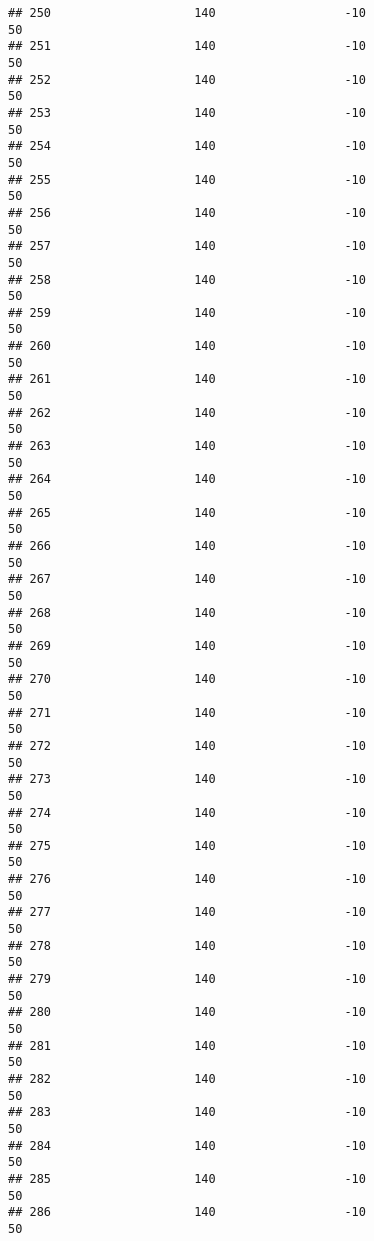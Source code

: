 \documentclass[]{article}
\begin{document}
\begin{verbatim}
## 250                    140                  -10                   50
## 251                    140                  -10                   50
## 252                    140                  -10                   50
## 253                    140                  -10                   50
## 254                    140                  -10                   50
## 255                    140                  -10                   50
## 256                    140                  -10                   50
## 257                    140                  -10                   50
## 258                    140                  -10                   50
## 259                    140                  -10                   50
## 260                    140                  -10                   50
## 261                    140                  -10                   50
## 262                    140                  -10                   50
## 263                    140                  -10                   50
## 264                    140                  -10                   50
## 265                    140                  -10                   50
## 266                    140                  -10                   50
## 267                    140                  -10                   50
## 268                    140                  -10                   50
## 269                    140                  -10                   50
## 270                    140                  -10                   50
## 271                    140                  -10                   50
## 272                    140                  -10                   50
## 273                    140                  -10                   50
## 274                    140                  -10                   50
## 275                    140                  -10                   50
## 276                    140                  -10                   50
## 277                    140                  -10                   50
## 278                    140                  -10                   50
## 279                    140                  -10                   50
## 280                    140                  -10                   50
## 281                    140                  -10                   50
## 282                    140                  -10                   50
## 283                    140                  -10                   50
## 284                    140                  -10                   50
## 285                    140                  -10                   50
## 286                    140                  -10                   50

\end{verbatim}
\end{document}
